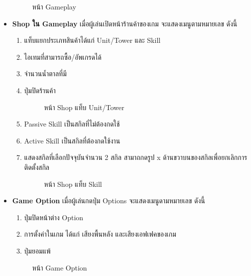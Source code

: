 \documentclass[12pt,oneside,openright,a4paper]{cpe-thai-project}
\begin{document}
\begin{itemize}
  \begin{figure}[H]\centering
    \setlength{\fboxsep}{0cm}
    \caption{หน้า Gameplay}\label{fig:3-13}
  \end{figure}
  

  \item \textbf{Shop ใน Gameplay} เมื่อผู้เล่นเปิดหน้าร้านค้าของเกม จะแสดงเมนูตามหมายเลข ดังนี้
  \begin{enumerate}
    \item แท็บแยกประเภทสินค้าได้แก่ Unit/Tower และ Skill
    \item ไอเทมที่สามารถซื้อ/อัพเกรดได้
    \item จำนวนน้ำตาลที่มี
    \item ปุ่มปิดร้านค้า
    
    \begin{figure}[H]\centering
      \setlength{\fboxsep}{0cm}
      \caption{หน้า Shop แท็บ Unit/Tower}\label{fig:3-14}
    \end{figure}

    \item Passive Skill เป็นสกิลที่ไม่ต้องกดใช้
    \item Active Skill เป็นสกิลที่ต้องกดใช้งาน
    \item แสดงสกิลที่เลือกปัจจุบันจำนวน 2 สกิล สามาถกดรูป x 
    ด้านขวาบนของสกิลเพื่อยกเลิกการติดตั้งสกิล

    \begin{figure}[H]\centering
      \setlength{\fboxsep}{0cm}
      \caption{หน้า Shop แท็บ Skill}\label{fig:3-15}
    \end{figure}

  \end{enumerate}
  
  \pagebreak
  \item \textbf{Game Option} เมื่อผู้เล่นกดปุ่ม Options จะแสดงเมนูดามหมายเลข ดังนี้
  \begin{enumerate}
    \item ปุ่มปิดหน้าต่าง Option
    \item การตั้งค่าในเกม ได้แก่ เสียงพื้นหลัง และเสียงเอฟเฟคของเกม
    \item ปุ่มยอมแพ้
  \end{enumerate}

  \begin{figure}[H]\centering
    \setlength{\fboxsep}{0cm}
    \caption{หน้า Game Option}\label{fig:3-16}
  \end{figure}
  

\end{itemize}
\end{document}

